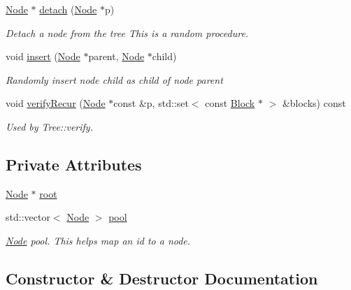 \begin{DoxyCompactItemize}
\hyperlink{structTTree_1_1Node}{Node} $\ast$ \hyperlink{classTTree_ab9b74f48afd54c16fd1dc3b598019f7f}{detach} (\hyperlink{structTTree_1_1Node}{Node} $\ast$p)
\begin{DoxyCompactList}\small\item\em Detach a node from the tree This is a random procedure. \end{DoxyCompactList}\item 
void \hyperlink{classTTree_a0bc18fd4039dc1ae0a53d2b68741a92b}{insert} (\hyperlink{structTTree_1_1Node}{Node} $\ast$parent, \hyperlink{structTTree_1_1Node}{Node} $\ast$child)
\begin{DoxyCompactList}\small\item\em Randomly insert node {\ttfamily child} as child of node {\ttfamily parent} \end{DoxyCompactList}\item 
void \hyperlink{classTTree_ab50938f36651a0cb2077ae84de2576a7}{verify\+Recur} (\hyperlink{structTTree_1_1Node}{Node} $\ast$const \&p, std\+::set$<$ const \hyperlink{structBlock}{Block} $\ast$ $>$ \&blocks) const 
\begin{DoxyCompactList}\small\item\em Used by Tree\+::verify. \end{DoxyCompactList}\end{DoxyCompactItemize}
\subsection*{Private Attributes}
\begin{DoxyCompactItemize}
\item 
\hyperlink{structTTree_1_1Node}{Node} $\ast$ \hyperlink{classTTree_a76972bd24a6d2f940fe1645d008a4a04}{root}
\item 
std\+::vector$<$ \hyperlink{structTTree_1_1Node}{Node} $>$ \hyperlink{classTTree_a58f7a793347834e9caee3d87c7202966}{pool}
\begin{DoxyCompactList}\small\item\em \hyperlink{structTTree_1_1Node}{Node} pool. This helps map an id to a node. \end{DoxyCompactList}\end{DoxyCompactItemize}


\subsection{Constructor \& Destructor Documentation}
\hypertarget{classTTree_a86fa5aaf9e0e661ab3711fc70c99070e}{}
